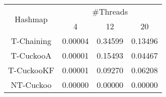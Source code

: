 \begin{tabular}{|c|c|c|c|}
\hline
\multirow{2}{*}{Hashmap} & \multicolumn{3}{c|}{\#Threads}\\\cline{2-4}& 4 & 12 & 20\\
\hline
\hline
T-Chaining & 0.00004 & 0.34599 & 0.13496\\
T-CuckooA & 0.00001 & 0.15493 & 0.04467\\
T-CuckooKF & 0.00001 & 0.09270 & 0.06208\\
NT-Cuckoo & 0.00000 & 0.00000 & 0.00000\\
\hline
\end{tabular}
